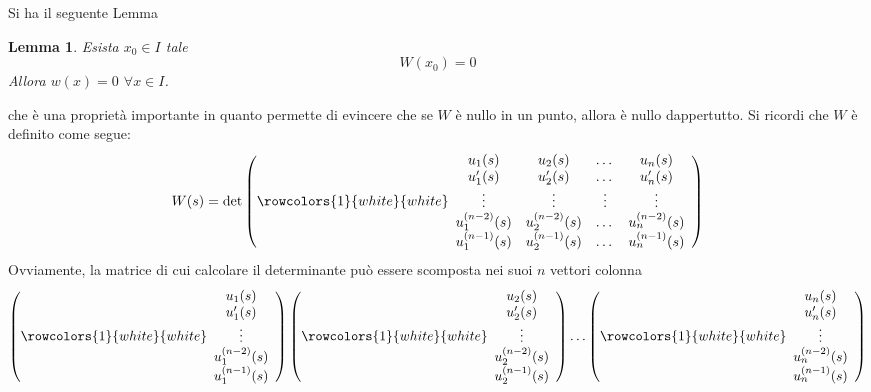 \documentclass[a4paper]{extarticle}
\newtheorem{lemma}[theorem]{Lemma}
\begin{document}
\vspace{2em}
\noindent
Si ha il seguente Lemma
\begin{lemma}
    Esista $x_0 \in I$ tale
    \[W(x_0) = 0\]
    Allora $w(x)=0$ $\forall x \in I$.
\end{lemma}
che è una proprietà importante in quanto permette di evincere che se $W$ è nullo in un punto, allora è nullo dappertutto. Si ricordi che $W$ è definito come segue:
\[{W(s)} = \det \left(
    \rowcolors{1}{white}{white}
    \begin{array}{cccc}
        u_1(s) & u_2(s) & \dots & u_n(s)\\
        u_1'(s) & u_2'(s) & \dots & u_n'(s)\\
        \vdots & \vdots & \vdots & \vdots\\
        u_1^{(n-2)}(s) & u_2^{(n-2)}(s) & \dots & u_n^{(n-2)}(s)\\
        u_1^{(n-1)}(s) & u_2^{(n-1)}(s) & \dots & u_n^{(n-1)}(s)\\
    \end{array}
\right)\]
Ovviamente, la matrice di cui calcolare il determinante può essere scomposta nei suoi $n$ vettori colonna
\[\left(
    \rowcolors{1}{white}{white}
    \begin{array}{cccc}
        u_1(s)\\
        u_1'(s)\\
        \vdots\\
        u_1^{(n-2)}(s)\\
        u_1^{(n-1)}(s)\\
    \end{array}
\right) \left(
    \rowcolors{1}{white}{white}
    \begin{array}{cccc}
        u_2(s)\\
        u_2'(s)\\
        \vdots\\
        u_2^{(n-2)}(s)\\
        u_2^{(n-1)}(s)\\
    \end{array}
\right) \dots \left(
    \rowcolors{1}{white}{white}
    \begin{array}{cccc}
        u_n(s)\\
        u_n'(s)\\
        \vdots\\
        u_n^{(n-2)}(s)\\
        u_n^{(n-1)}(s)\\
    \end{array}
\right)\]
\end{document}
